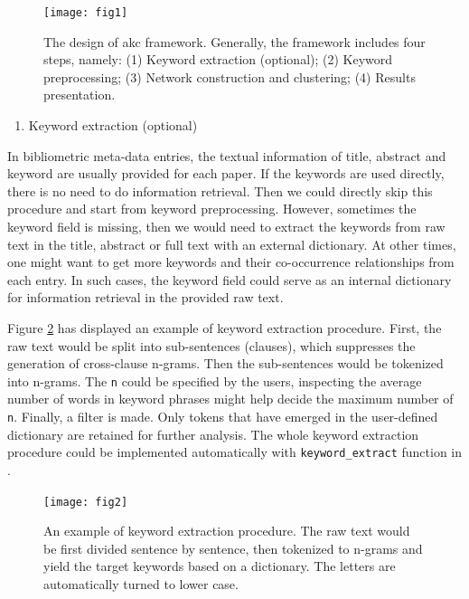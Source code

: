 \begin{Schunk}
\begin{figure}
\texttt{[image: fig1]} \caption[The design of akc framework]{The design of akc framework. Generally, the framework includes four steps, namely: (1)    Keyword extraction (optional); (2) Keyword preprocessing; (3)   Network construction and clustering; (4)    Results presentation.}\label{fig:fig1}
\end{figure}
\end{Schunk}

\begin{enumerate}
\def\labelenumi{(\arabic{enumi})}
\tightlist
\item
  Keyword extraction (optional)
\end{enumerate}

In bibliometric meta-data entries, the textual information of title,
abstract and keyword are usually provided for each paper. If the
keywords are used directly, there is no need to do information
retrieval. Then we could directly skip this procedure and start from
keyword preprocessing. However, sometimes the keyword field is missing,
then we would need to extract the keywords from raw text in the title,
abstract or full text with an external dictionary. At other times, one
might want to get more keywords and their co-occurrence relationships
from each entry. In such cases, the keyword field could serve as an
internal dictionary for information retrieval in the provided raw text.

Figure \ref{fig:fig2} has displayed an example of keyword extraction
procedure. First, the raw text would be split into sub-sentences
(clauses), which suppresses the generation of cross-clause n-grams. Then
the sub-sentences would be tokenized into n-grams. The \texttt{n} could
be specified by the users, inspecting the average number of words in
keyword phrases might help decide the maximum number of \texttt{n}.
Finally, a filter is made. Only tokens that have emerged in the
user-defined dictionary are retained for further analysis. The whole
keyword extraction procedure could be implemented automatically with
\texttt{keyword\_extract} function in .

\begin{Schunk}
\begin{figure}
\texttt{[image: fig2]} \caption[An example of keyword extraction procedure]{An example of keyword extraction procedure. The raw text would be first divided sentence by sentence, then tokenized to n-grams and yield the target keywords based on a dictionary. The letters are automatically turned to lower case.}\label{fig:fig2}
\end{figure}
\end{Schunk}

